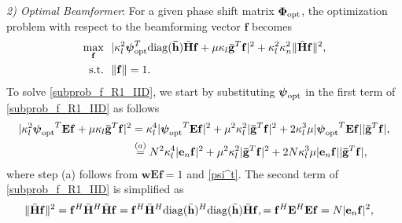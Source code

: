 \documentclass[journal,draftclsnofoot,onecolumn,12pt]{IEEEtran}
\begin{document}
\emph{2) Optimal Beamformer}: For a given phase shift matrix $\mathbf{\Phi}_{\rm opt}$, the optimization problem with respect to the beamforming vector $\mathbf{f}$ becomes
\begin{subequations}
\begin{align} 
    \max_{\mathbf{f}}~~ &|\kappa_l^2 \boldsymbol{\psi}_{\rm opt}^T{\rm diag}(\mathbf{\bar{h}}) \bar{\mathbf{H}} \mathbf{f} +\mu \kappa_l \bar{\mathbf{g}}^T\mathbf{f}|^2 + \kappa_l^2\kappa_n^2\|\bar{\mathbf{H}}\mathbf{f}\|^2,\label{subprob_f_R1_IID}\\
   \text{s.t.}~~&\|\mathbf{f}\|=1.
\end{align}   
\end{subequations}
To solve \eqref{subprob_f_R1_IID}, we start by substituting $\boldsymbol{\psi}_{\rm opt}$ in the first term of \eqref{subprob_f_R1_IID} as follows
 \begin{align}
     |\kappa_l^2 {\boldsymbol{\psi}_{\rm opt}}^T\mathbf{Ef} +\mu \kappa_l \mathbf{\bar{g}}^T\mathbf{f}|^2
     &=\kappa_l^4 |{\boldsymbol{\psi}_{\rm opt}}^T\mathbf{Ef}|^2 +\mu^2 \kappa_l^2 |\mathbf{\bar{g}}^T\mathbf{f}|^2+2\kappa_l^3\mu |{\boldsymbol{\psi}_{\rm opt}}^T\mathbf{Ef}||\mathbf{\bar{g}}^T\mathbf{f}|,\nonumber\\
     &\stackrel{(a)}{=}N^2\kappa_l^4|\mathbf{e}_n \mathbf{f}|^2 +\mu^2 \kappa_l^2 |\mathbf{\bar{g}}^T\mathbf{f}|^2+2N\kappa_l^3\mu |\mathbf{e}_n\mathbf{f}||\mathbf{\bar{g}}^T\mathbf{f}|,\label{term1}
 \end{align}
where step (a) follows from $\mathbf{wEf}=1$ and \eqref{psi^t}. 
The second term of \eqref{subprob_f_R1_IID} is simplified as
 \vspace{-0.2cm}
 \begin{align}     \|\bar{\mathbf{H}}\mathbf{f}\|^2&=\mathbf{f}^H\bar{\mathbf{H}}^H\bar{\mathbf{H}}\mathbf{f}=\mathbf{f}^H\bar{\mathbf{H}}^H{\rm diag}(\bar{\mathbf{h}})^H{\rm diag}(\bar{\mathbf{h}})\bar{\mathbf{H}}\mathbf{f},=\mathbf{f}^H\mathbf{E}^H\mathbf{Ef}=N|\mathbf{e}_n\mathbf{f}|^2,\label{term2}
 \end{align}
\end{document}
